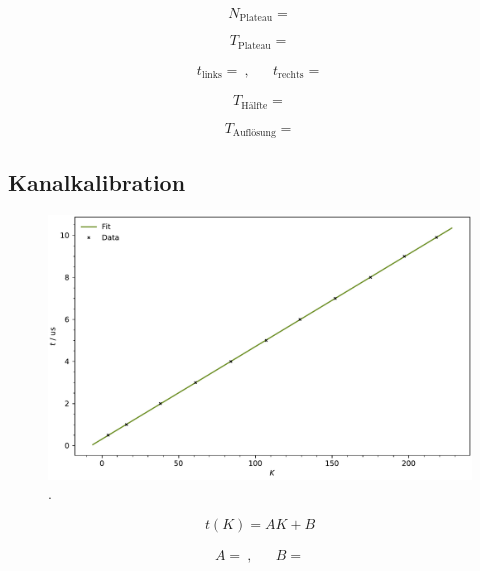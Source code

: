 \begin{equation*}
	N_\text{Plateau} = 
\end{equation*}

\begin{equation*}
	T_\text{Plateau} = 
\end{equation*}

\begin{align*}
	t_\text{links} =  \: , && t_\text{rechts} = 
\end{align*}

\begin{equation*}
	T_\text{Hälfte} = 
\end{equation*}

\begin{equation*}
	T_\text{Auflösung} = 
\end{equation*}



\subsection{Kanalkalibration}

\begin{figure}[H]
	\centering
	\includegraphics[width=\textwidth]{build/calibration.pdf}
	\caption{.}
	\label{fig:calibration}
\end{figure}

\begin{equation*}
	t(K) = AK + B
\end{equation*}

\begin{align*}
	A =  \: , && B = 
\end{align*}



